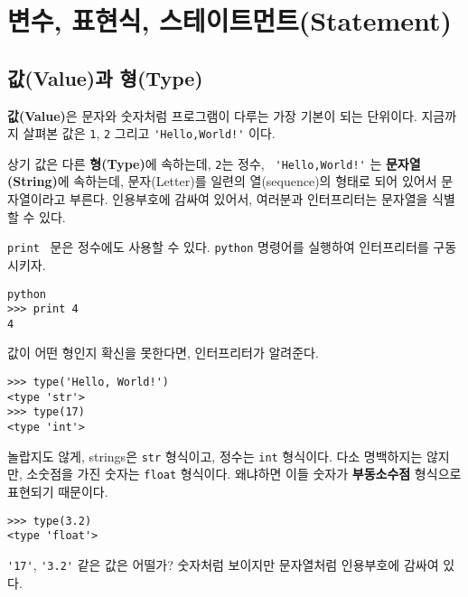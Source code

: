 
\chapter{변수, 표현식, 스테이트먼트(Statement)}

\section{값(Value)과 형(Type)}

{\bf 값(Value)}은 문자와 숫자처럼 프로그램이 다루는 가장 기본이 되는 단위이다. 
지금까지 살펴본 값은 {\tt 1}, {\tt 2} 그리고 \verb"'Hello,World!'" 이다.

상기 값은 다른 {\bf 형(Type)}에 속하는데, {\tt 2}는 정수, \verb" 'Hello,World!'" 는 
{\bf 문자열(String)}에 속하는데, 문자(Letter)를 일련의 열(sequence)의 형태로 되어 있어서 문자열이라고 부른다. 
인용부호에 감싸여 있어서, 여러분과 인터프리터는 문자열을 식별할 수 있다. 

{\tt print } 문은 정수에도 사용할 수 있다. {\tt python} 명령어를 실행하여 인터프리터를 구동시키자.


\beforeverb
\begin{verbatim}
python
>>> print 4
4
\end{verbatim}
\afterverb
%
값이 어떤 형인지 확신을 못한다면, 인터프리터가 알려준다.

\beforeverb
\begin{verbatim}
>>> type('Hello, World!')
<type 'str'>
>>> type(17)
<type 'int'>
\end{verbatim}
\afterverb
%

놀랍지도 않게, strings은 {\tt str} 형식이고, 정수는 {\tt int} 형식이다. 
다소 명백하지는 않지만, 소숫점을 가진 숫자는 {\tt float} 형식이다. 왜냐하면 이들 숫자가 {\bf 부동소수점} 형식으로 표현되기 때문이다.


\beforeverb
\begin{verbatim}
>>> type(3.2)
<type 'float'>
\end{verbatim}
\afterverb
%

\verb"'17'", \verb"'3.2'" 같은 값은 어떨가? 숫자처럼 보이지만 문자열처럼 인용부호에 감싸여 있다.

